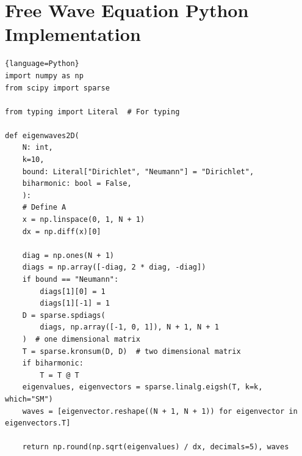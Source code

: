 \section{Free Wave Equation Python Implementation}

\begin{lstlisting}{language=Python}
import numpy as np
from scipy import sparse

from typing import Literal  # For typing

def eigenwaves2D(
    N: int,
    k=10,
    bound: Literal["Dirichlet", "Neumann"] = "Dirichlet",
    biharmonic: bool = False,
    ):
    # Define A
    x = np.linspace(0, 1, N + 1)
    dx = np.diff(x)[0]

    diag = np.ones(N + 1)
    diags = np.array([-diag, 2 * diag, -diag])
    if bound == "Neumann":
        diags[1][0] = 1
        diags[1][-1] = 1
    D = sparse.spdiags(
        diags, np.array([-1, 0, 1]), N + 1, N + 1
    )  # one dimensional matrix
    T = sparse.kronsum(D, D)  # two dimensional matrix
    if biharmonic:
        T = T @ T
    eigenvalues, eigenvectors = sparse.linalg.eigsh(T, k=k, which="SM")
    waves = [eigenvector.reshape((N + 1, N + 1)) for eigenvector in eigenvectors.T]

    return np.round(np.sqrt(eigenvalues) / dx, decimals=5), waves

\end{lstlisting}